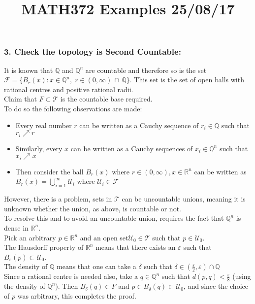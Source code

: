 \documentclass[11pt]{article}
\title{MATH372 Examples 25/08/17}
\author{}
\date{}
\theoremstyle{thm}
\begin{document}
\maketitle
\subsubsection{3. Check the topology is Second Countable:}
It is known that $\mathbb{Q}$ and $\mathbb{Q}^n$ are countable and therefore so 
is the set $\mathcal{F}=\{B_r(x): x \in \mathbb{Q}^n,\; r\in 
(0,\infty)\,\cap\,\mathbb{Q} \}$. This set is the set of open balls with 
rational centres and positive rational radii.\\[1em]
Claim that $F\subset \mathcal{T}$ is the countable base required.\\[1em]
To do so the following observations are made:
\begin{itemize}
	\item Every real number $r$ can be written as a Cauchy sequence of $r_i\in \mathbb{Q}$ such that $r_i \nearrow r$
	\item Similarly, every $x$ can be written as a Cauchy sequences of $x_i\in \mathbb{Q}^n $ such that $x_i \nearrow x$
	\item Then consider the ball $B_r(x)$ where $r\in (0,\infty), x\in \mathbb{R}^n$ can be written as $B_r(x)=\bigcup\limits_{i=1}^{\infty}{\mathcal{U}_i}$ where $\mathcal{U}_i \in \mathcal{F}$
\end{itemize}
However, there is a problem, sets in $\mathcal{T}$ can be uncountable unions, 
meaning it is unknown whether the union, as above, is countable or not.\\[1em] 
To resolve this and to avoid an uncountable union, requires the fact that 
$\mathbb{Q}^n$ is dense in $\mathbb{R}^n$.\\[1em]
Pick an arbitrary $p\in \mathbb{R}^n$ and an open set$ \mathcal{U}_0 \in 
\mathcal{T}$ such that $p\in \mathcal{U}_0$.\\[1em]
The Hausdorff property of $\mathbb{R}^n$ means that there exists an $\varepsilon$ such that $B_\varepsilon(p) \subset \mathcal{U}_0$.\\[1em]
The density of $\mathbb{Q}$ means that one can take a $\delta$ such that $\delta \in  (\frac{\varepsilon}{2},\varepsilon) \cap \mathbb{Q}$\\[1em]
Since a rational centre is needed also, take a $q \in \mathbb{Q}^n$ such that $d(p,q)<\displaystyle\frac{\varepsilon}{8}$ (using the density of $\mathbb{Q}^n$).
Then $B_\delta(q) \in F$ and $p\in B_\delta(q)\subset \mathcal{U}_0$, and since 
the choice of $p$ was arbitrary, this completes the proof.
\end{document}
